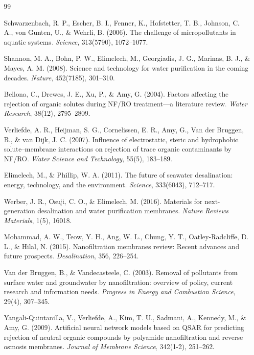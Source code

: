 \documentclass[10pt,twocolumn]{article}
\begin{document}
\begin{thebibliography}{99}

 Schwarzenbach, R. P., Escher, B. I., Fenner, K., Hofstetter, T. B., Johnson, C. A., von Gunten, U., \& Wehrli, B. (2006). The challenge of micropollutants in aquatic systems. \textit{Science}, 313(5790), 1072--1077.

 Shannon, M. A., Bohn, P. W., Elimelech, M., Georgiadis, J. G., Marinas, B. J., \& Mayes, A. M. (2008). Science and technology for water purification in the coming decades. \textit{Nature}, 452(7185), 301--310.

 Bellona, C., Drewes, J. E., Xu, P., \& Amy, G. (2004). Factors affecting the rejection of organic solutes during NF/RO treatment---a literature review. \textit{Water Research}, 38(12), 2795--2809.

 Verliefde, A. R., Heijman, S. G., Cornelissen, E. R., Amy, G., Van der Bruggen, B., \& van Dijk, J. C. (2007). Influence of electrostatic, steric and hydrophobic solute--membrane interactions on rejection of trace organic contaminants by NF/RO. \textit{Water Science and Technology}, 55(5), 183--189.

 Elimelech, M., \& Phillip, W. A. (2011). The future of seawater desalination: energy, technology, and the environment. \textit{Science}, 333(6043), 712--717.

 Werber, J. R., Osuji, C. O., \& Elimelech, M. (2016). Materials for next-generation desalination and water purification membranes. \textit{Nature Reviews Materials}, 1(5), 16018.

 Mohammad, A. W., Teow, Y. H., Ang, W. L., Chung, Y. T., Oatley-Radcliffe, D. L., \& Hilal, N. (2015). Nanofiltration membranes review: Recent advances and future prospects. \textit{Desalination}, 356, 226--254.

 Van der Bruggen, B., \& Vandecasteele, C. (2003). Removal of pollutants from surface water and groundwater by nanofiltration: overview of policy, current research and information needs. \textit{Progress in Energy and Combustion Science}, 29(4), 307--345.

 Yangali-Quintanilla, V., Verliefde, A., Kim, T. U., Sadmani, A., Kennedy, M., \& Amy, G. (2009). Artificial neural network models based on QSAR for predicting rejection of neutral organic compounds by polyamide nanofiltration and reverse osmosis membranes. \textit{Journal of Membrane Science}, 342(1-2), 251--262.


\end{thebibliography}
\end{document}
